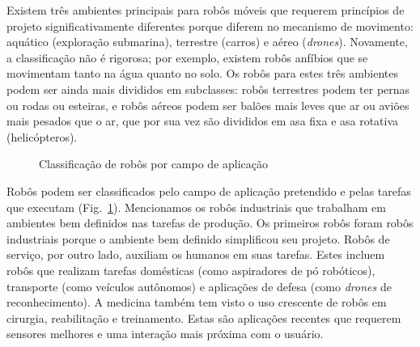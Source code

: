Existem três ambientes principais para robôs móveis que requerem princípios de projeto significativamente diferentes porque diferem no mecanismo de movimento: aquático (exploração submarina), terrestre (carros) e aéreo (\emph{drones}). Novamente, a classificação não é rigorosa; por exemplo, existem robôs anfíbios que se movimentam tanto na água quanto no solo. Os robôs para estes três ambientes podem ser ainda mais divididos em subclasses: robôs terrestres podem ter pernas ou rodas ou esteiras, e robôs aéreos podem ser balões mais leves que ar ou aviões mais pesados que o ar, que por sua vez são divididos em asa fixa e asa rotativa (helicópteros).

\begin{figure}
\begin{center}
\end{center}
\caption{Classificação de robôs por campo de aplicação}\label{fig.classification2}
\end{figure}

Robôs podem ser classificados pelo campo de aplicação pretendido e pelas tarefas que executam (Fig.~\ref{fig.classification2}). Mencionamos os robôs industriais que trabalham em ambientes bem definidos nas tarefas de produção. Os primeiros robôs foram robôs industriais porque o ambiente bem definido simplificou seu projeto. Robôs de serviço, por outro lado, auxiliam os humanos em suas tarefas. Estes incluem robôs que realizam tarefas domésticas (como aspiradores de pó robóticos), transporte (como veículos autônomos) e aplicações de defesa (como \emph{drones} de reconhecimento). A medicina também tem visto o uso crescente de robôs em cirurgia, reabilitação e treinamento. Estas são aplicações recentes que requerem sensores melhores e uma interação mais próxima com o usuário.

